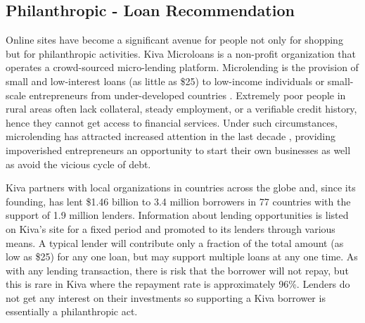     \subsection{Philanthropic - Loan Recommendation}

        Online sites have become a significant avenue for people not only for shopping but for philanthropic activities. Kiva Microloans is a non-profit organization that operates a crowd-sourced micro-lending platform. Microlending is the provision of small and low-interest loans (as little as \$25) to low-income individuals or small-scale entrepreneurs from under-developed countries \cite{yunus1998banker}. Extremely poor people in rural areas often lack collateral, steady employment, or a verifiable credit history, hence they cannot get access to financial services. Under such circumstances, microlending has attracted increased attention in the last decade \cite{chen2017microfinance}, providing impoverished entrepreneurs an opportunity to start their own businesses as well as avoid the vicious cycle of debt.
        
        
        
        Kiva partners with local organizations in countries across the globe and, since its founding, has lent \$1.46 billion to 3.4 million borrowers in 77 countries with the support of 1.9 million lenders. Information about lending opportunities is listed on Kiva's site for a fixed period and promoted to its lenders through various means. A typical lender will contribute only a fraction of the total amount (as low as \$25) for any one loan, but may support multiple loans at any one time. As with any lending transaction, there is risk that the borrower will not repay, but this is rare in Kiva where the repayment rate is approximately 96\%. Lenders do not get any interest on their investments so supporting a Kiva borrower is essentially a philanthropic act.
        
